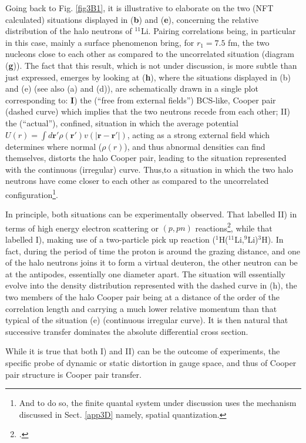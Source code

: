 Going back to Fig. \ref{fig3B1}, it is illustrative to elaborate on the two (NFT calculated) situations displayed in (\textbf{b}) and (\textbf{e}), concerning the relative distribution of the halo neutrons of $^{11}$Li. Pairing correlations being, in particular in this case, mainly a surface phenomenon bring, for $r_1=7.5$ fm, the two nucleons close to each other as compared to the uncorrelated situation (diagram (\textbf{g})). The fact that this result, which is not under discussion, is more subtle than just expressed, emerges by looking at (\textbf{h}), where the situations displayed in (b) and (e) (see also (a) and (d)), are schematically drawn in a single plot corresponding to: \textbf{I}) the (``free from external fields'') BCS-like, Cooper pair  (dashed curve) which implies that the two neutrons recede from each other; II) the (``actual''), confined, situation in which the average potential $U(r)=\int  d\mathbf r' \rho(\mathbf r')v(|\mathbf r-\mathbf r'|)$, acting as a strong external field which determines where normal ($\rho(r)$), and thus abnormal densities can find themselves, distorts the halo Cooper pair, leading to the situation represented with the continuous (irregular) curve. Thus,to a situation in which the two halo neutrons have come closer to each other as compared to the uncorrelated configuration\footnote{And to do so, the finite quantal system under discussion uses the mechanism discussed in Sect. \ref{app3D} namely, spatial quantization.}. 


In principle, both situations can be experimentally observed. That labelled II) in terms of high energy electron scattering or $(p,pn)$ reactions\footnote{\cite{Kubota:20}.}, while that labelled I),  making use of a two-particle pick up reaction ($^1$H($^{11}$Li,$^9$Li)$^3$H). In fact, during the period of time the proton is around the grazing distance, and one of the halo neutrons joins it to form a virtual deuteron, the other neutron can be at the antipodes, essentially one diameter apart. The situation will essentially evolve into the density distribution represented with the dashed curve in (h), the two members of the halo Cooper pair being at a distance of the order of the correlation length  and carrying a much lower relative momentum than that typical of the situation (e) (continuous irregular curve). It is then natural that successive transfer dominates the absolute differential cross section.

While it is true that both I) and II) can be the outcome of experiments, the specific probe of dynamic or static distortion in gauge space, and thus of Cooper pair structure is Cooper pair transfer.



